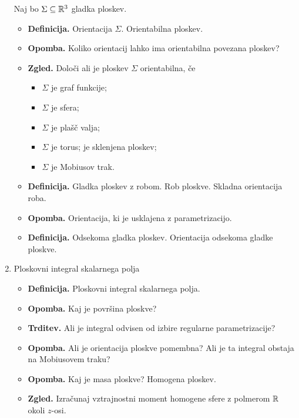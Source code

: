\begin{enumerate}
    Naj bo \(\Sigma \subseteq \mathbb{R}^3\) gladka ploskev.
    \begin{itemize}
        \item \textbf{Definicija.} Orientacija \(\Sigma\). Orientabilna ploskev.
        \item \textbf{Opomba.} Koliko orientacij lahko ima orientabilna povezana ploskev?
        \item \textbf{Zgled.} Določi ali je ploskev \(\Sigma\) orientabilna, če 
        \begin{itemize}
            \item \(\Sigma\) je graf funkcije;
            \item \(\Sigma\) je sfera;
            \item \(\Sigma\) je plašč valja;
            \item \(\Sigma\) je torus; je sklenjena ploskev;
            \item \(\Sigma\) je Mobiusov trak.
        \end{itemize}
        \item \textbf{Definicija.} Gladka ploskev z robom. Rob ploskve. Skladna orientacija roba.
        \item \textbf{Opomba.} Orientacija, ki je usklajena z parametrizacijo.
        \item \textbf{Definicija.} Odsekoma gladka ploskev. Orientacija odsekoma gladke ploskve.
    \end{itemize}

    \newpage
    \item Ploskovni integral skalarnega polja
    \begin{itemize}
        \item \textbf{Definicija.} Ploskovni integral skalarnega polja.
        \item \textbf{Opomba.} Kaj je površina ploskve?
        \item \textbf{Trditev.} Ali je integral odvisen od izbire regularne parametrizacije?
        \item \textbf{Opomba.} Ali je orientacija ploskve pomembna? Ali je ta integral obstaja na Mobiusovem traku?
        \item \textbf{Opomba.} Kaj je masa ploskve? Homogena ploskev.
        \item \textbf{Zgled.} Izračunaj vztrajnostni moment homogene sfere z polmerom \(\mathbb{R}\) okoli \(z\)-osi.
    \end{itemize}


\end{enumerate}
